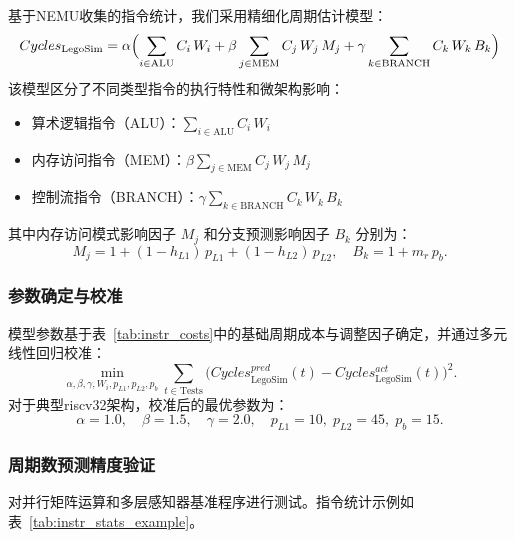 \documentclass[bachelor]{thesis-uestc}
\begin{document}
基于NEMU收集的指令统计，我们采用精细化周期估计模型：
\begin{equation}
Cycles_{\mathrm{LegoSim}}
= \alpha \Bigl(
  \sum_{i \in \mathrm{ALU}} C_i\,W_i
  + \beta \sum_{j \in \mathrm{MEM}} C_j\,W_j\,M_j
  + \gamma \sum_{k \in \mathrm{BRANCH}} C_k\,W_k\,B_k
\Bigr)
\end{equation}
该模型区分了不同类型指令的执行特性和微架构影响：
\begin{itemize}
  \item 算术逻辑指令（ALU）：$\sum_{i \in \mathrm{ALU}} C_i\,W_i$
  \item 内存访问指令（MEM）：$\beta \sum_{j \in \mathrm{MEM}} C_j\,W_j\,M_j$
  \item 控制流指令（BRANCH）：$\gamma \sum_{k \in \mathrm{BRANCH}} C_k\,W_k\,B_k$
\end{itemize}
其中内存访问模式影响因子 $M_j$ 和分支预测影响因子 $B_k$ 分别为：
\begin{equation}
M_j = 1 + (1 - h_{L1})\,p_{L1} + (1 - h_{L2})\,p_{L2},
\quad
B_k = 1 + m_r\,p_b.
\end{equation}

\subsubsection{参数确定与校准}

模型参数基于表~\ref{tab:instr_costs}中的基础周期成本与调整因子确定，并通过多元线性回归校准：
\begin{equation}
\min_{\alpha,\beta,\gamma, W_i, p_{L1}, p_{L2}, p_b}
\sum_{t \in \mathrm{Tests}}
\bigl(Cycles_{\mathrm{LegoSim}}^{pred}(t) - Cycles_{\mathrm{LegoSim}}^{act}(t)\bigr)^2.
\end{equation}
对于典型riscv32架构，校准后的最优参数为：
\[
\alpha=1.0,\quad \beta=1.5,\quad \gamma=2.0,\quad
p_{L1}=10,\;p_{L2}=45,\;p_b=15.
\]

\subsubsection{周期数预测精度验证}

对并行矩阵运算和多层感知器基准程序进行测试。指令统计示例如表~\ref{tab:instr_stats_example}。
\end{document}
